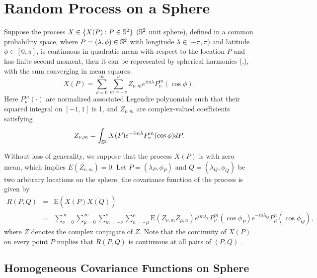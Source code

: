 %
%
%



\section{Random Process on a Sphere}
	
Suppose the process $X \in \{X(P): P\in \mathbb{S}^2\}$ ($\mathbb{S}^2$ unit sphere), defined in a common probability space, where $P=(\lambda, \phi) \in \mathbb{S}^2$ with longitude $\lambda \in [-\pi, \pi)$ and latitude $\phi \in [0, \pi]$, is continuous in quadratic mean with respect to the location $P$ and has finite second moment, then it can be represented by spherical harmonics (\cite{Jones1963},\cite{LiNorth1997, Huang2012}), with the sum converging in mean squares.
	\[
	X(P) = \sum_{\nu=0}^\infty \sum_{m=-\nu}^{\nu} Z_{\nu,m} e^{i m \lambda} P_{\nu}^m (\cos \phi).
	\]
Here $P_{\nu}^m(\cdot)$ are normalized associated Legendre polynomials such that their squared integral on $[-1, 1]$
is 1, and $Z_{\nu,m}$ are complex-valued coefficients satisfying	
	\[
	Z_{\nu,m} = \int_{\mathbb{S}^2} X(P) e^{-im \lambda} P_{\nu}^m (\cos \phi) d P.
	\]
				
	Without loss of generality, we suppose that the process $X(P)$ is with zero mean, which implies $E(Z_{\nu,m}) = 0$. Let $P = (\lambda_P, \phi_P)$ and $Q=(\lambda_Q, \phi_Q)$ be two arbitrary locations on the sphere, the covariance function of the process is given by
	\begin{eqnarray*} \label{rpq_1}
		R(P, Q) &=& \mbox{E}(X(P) \overline{X(Q)}) \\
		&=& \sum_{\nu=0}^\infty \sum_{\mu=0}^\infty \sum_{m=-\nu}^{\nu} \sum_{n=-\mu}^{\mu} \mbox{E}(Z_{\nu,m} \overline{Z}_{\mu,n}) e^{im \lambda_P} P_{\nu}^m(\cos \phi_P) e^{-i n \lambda_Q} P_{\mu}^n (\cos \phi_Q),
	\end{eqnarray*}
\noi where $\bar{Z}$ denotes the complex conjugate of $Z$. Note that the continuity of $X(P)$ on every point $P$ implies that $R(P, Q)$ is continuous at all pairs of $(P, Q)$ \cite[page 83]{Leadbetter1967}.
	
	\subsection{Homogeneous Covariance Functions on Sphere}
	
